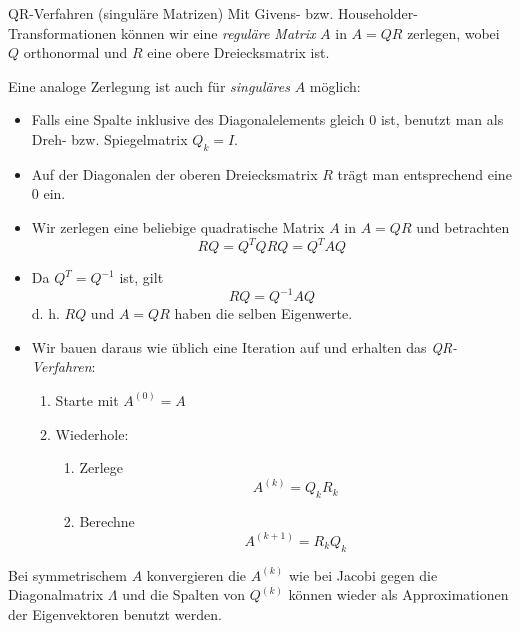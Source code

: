\begin{defi}{QR-Verfahren (singuläre Matrizen)}
    Mit Givens- bzw. Householder-Transformationen können wir eine \emph{reguläre Matrix} $A$ in $A = QR$ zerlegen, wobei $Q$ orthonormal und $R$ eine obere Dreiecksmatrix ist.

    Eine analoge Zerlegung ist auch für \emph{singuläres} $A$ möglich:
    \begin{itemize}
        \item Falls eine Spalte inklusive des Diagonalelements gleich $0$ ist, benutzt man als Dreh- bzw. Spiegelmatrix $Q_k = I$.
        \item Auf der Diagonalen der oberen Dreiecksmatrix $R$ trägt man entsprechend eine $0$ ein.
        \item Wir zerlegen eine beliebige quadratische Matrix $A$ in $A = QR$ und betrachten
              \[
                  RQ = Q^T Q R Q = Q^T A Q
              \]
        \item Da $Q^T = Q^{-1}$ ist, gilt
              \[
                  RQ = Q^{-1} A Q
              \]
              d. h. $RQ$ und $A = QR$ haben die selben Eigenwerte.
        \item Wir bauen daraus wie üblich eine Iteration auf und erhalten das \emph{QR-Verfahren}:
              \begin{enumerate}
                  \item Starte mit $A^{(0)} = A$
                  \item Wiederhole:
                        \begin{enumerate}
                            \item Zerlege
                                  \[
                                      A^{(k)} = Q_k R_k
                                  \]
                            \item Berechne
                                  \[
                                      A^{(k+1)} = R_k Q_k
                                  \]
                        \end{enumerate}
              \end{enumerate}
    \end{itemize}

    Bei symmetrischem $A$ konvergieren die $A^{(k)}$ wie bei Jacobi gegen die Diagonalmatrix $\Lambda$ und die Spalten von $Q^{(k)}$ können wieder als Approximationen der Eigenvektoren benutzt werden.
\end{defi}

